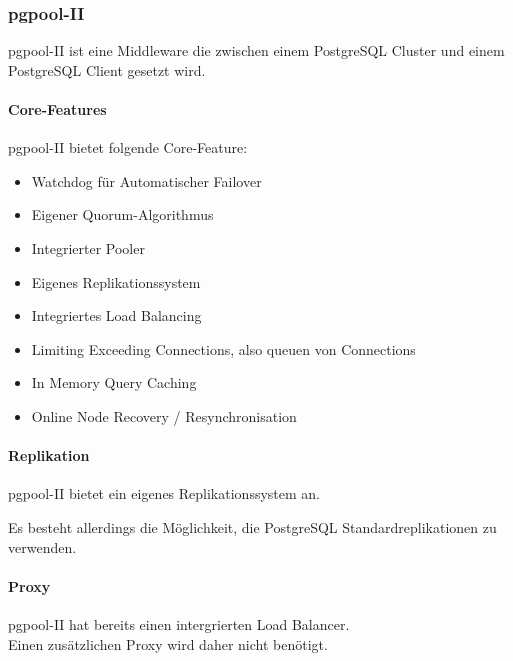 
\subsubsection{pgpool-II}
\begin{flushleft}
    pgpool-II ist eine Middleware die zwischen einem \Gls{PostgreSQL Cluster} und einem PostgreSQL Client gesetzt wird.
\end{flushleft}
\begin{flushleft}
    \paragraph{Core-Features}
    pgpool-II bietet folgende Core-Feature\cite{3XWCD3KX}:
    \begin{itemize}
        \item Watchdog für Automatischer Failover
        \item Eigener \Gls{Quorum}-Algorithmus
        \item Integrierter Pooler
        \item Eigenes Replikationssystem
        \item Integriertes Load Balancing
        \item Limiting Exceeding Connections, also queuen von Connections
        \item In Memory Query Caching
        \item Online Node Recovery / Resynchronisation
    \end{itemize}
\end{flushleft}
\begin{flushleft}
    \paragraph{Replikation}
    pgpool-II bietet ein eigenes Replikationssystem an.
\end{flushleft}
\begin{flushleft}
    Es besteht allerdings die Möglichkeit, die PostgreSQL Standardreplikationen zu verwenden.
\end{flushleft}
\begin{flushleft}
    \paragraph{Proxy}
    pgpool-II hat bereits einen intergrierten Load Balancer.\\
    Einen zusätzlichen Proxy wird daher nicht benötigt.
\end{flushleft}
